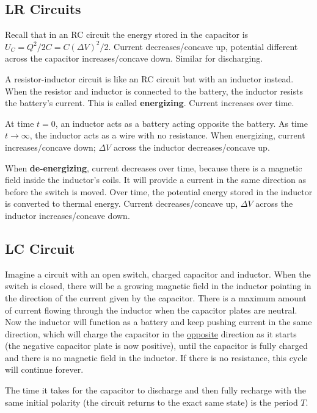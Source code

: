 \documentclass{article}
\begin{document}
\subsection{LR Circuits}

Recall that in an RC circuit the energy stored in the capacitor is $U_C=Q^2/2C=C(\Delta V)^2/2$. Current decreases/concave up, potential different across the capacitor increases/concave down. Similar for discharging.

A resistor-inductor circuit is like an RC circuit but with an inductor instead. When the resistor and inductor is connected to the battery, the inductor resists the battery's current. This is called \textbf{energizing}. Current increases over time.

At time $t=0$, an inductor acts as a battery acting opposite the battery. As time $t\to\infty$, the inductor acts as a wire with no resistance. When energizing, current increases/concave down; $\Delta V$ across the inductor decreases/concave up.

When \textbf{de-energizing}, current decreases over time, because there is a magnetic field inside the inductor's coils. It will provide a current in the same direction as before the switch is moved. Over time, the potential energy stored in the inductor is converted to thermal energy. Current decreases/concave up, $\Delta V$ across the inductor increases/concave down.

\subsection{LC Circuit}

Imagine a circuit with an open switch, charged capacitor and inductor. When the switch is closed, there will be a growing magnetic field in the inductor pointing in the direction of the current given by the capacitor. There is a maximum amount of current flowing through the inductor when the capacitor plates are neutral. Now the inductor will function as a battery and keep pushing current in the same direction, which will charge the capacitor in the \ul{opposite} direction as it starts (the negative capacitor plate is now positive), until the capacitor is fully charged and there is no magnetic field in the inductor. If there is no resistance, this cycle will continue forever.

The time it takes for the capacitor to discharge and then fully recharge with the same initial polarity (the circuit returns to the exact same state) is the period $T$.
\end{document}
